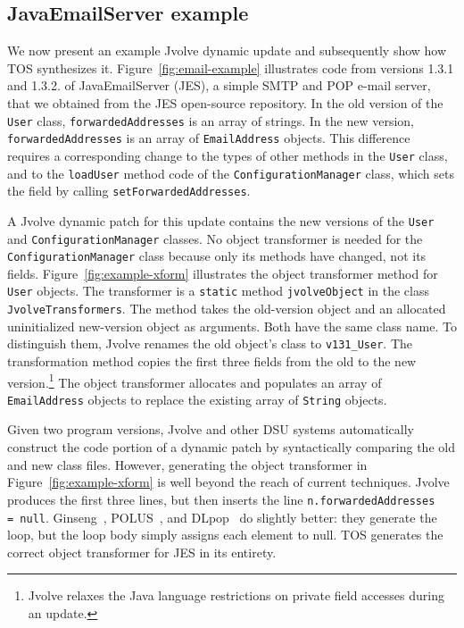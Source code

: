 \documentclass[natbib,10pt]{sigplanconf}
\newcommand{\code}[1]{\lstinline|#1|\xspace}
\newcommand{\TOS}{TOS\xspace}
\begin{document}

\subsection{JavaEmailServer example}

We now present an example Jvolve dynamic
update and subsequently show how \TOS synthesizes it.
Figure~\ref{fig:email-example} illustrates code from versions
1.3.1 and 1.3.2. of JavaEmailServer (JES), a simple SMTP and POP e-mail
server, that we obtained from the JES open-source repository.  In the
old version of the \code{User} class, \code{forwardedAddresses} is an
array of strings.  In the new version, \code{forwardedAddresses} is an
array of \code{EmailAddress} objects.  This difference requires a
corresponding change to the types of other methods in the \code{User} class, and
to the \code{loadUser} method code of the \code{ConfigurationManager}
class, which sets the field by calling \code{setForwardedAddresses}.

A Jvolve dynamic patch for this update contains the new versions of
the \code{User} and \code{ConfigurationManager} classes.  No object
transformer is needed for the \code{ConfigurationManager} class
because only its methods have changed, not its fields.
Figure~\ref{fig:example-xform} illustrates the object transformer
method for \code{User} objects. The transformer is a \code{static}
method \code{jvolveObject} in the class \code{JvolveTransformers}.
The method takes the old-version object and an allocated uninitialized
new-version object as arguments.  Both have the same class name. To
distinguish them, Jvolve renames the old object's class to
\code{v131_User}.  The transformation method copies the first three
fields from the old to the new version.\footnote{Jvolve relaxes the Java language
  restrictions on private field accesses during an update.}  The
object transformer  
allocates and populates an array of \code{EmailAddress} objects to
replace the existing array of \code{String} objects.

Given two program versions, Jvolve and other DSU systems automatically
construct the code portion of a dynamic patch by syntactically
comparing the old and new class files. However, 
generating the object transformer in Figure~\ref{fig:example-xform} is
well beyond the reach of current techniques.  Jvolve produces the
first three lines, but then inserts the line \code{n.forwardedAddresses
  = null}.  Ginseng~\cite{neamtiu06dsu}, POLUS~\cite{chen:icse07}, and
DLpop~\cite{HicksNettles03} do slightly better: they
generate the loop, but the loop body simply assigns each element to null.
%
\TOS generates the correct object transformer for JES in its entirety.
\end{document}
